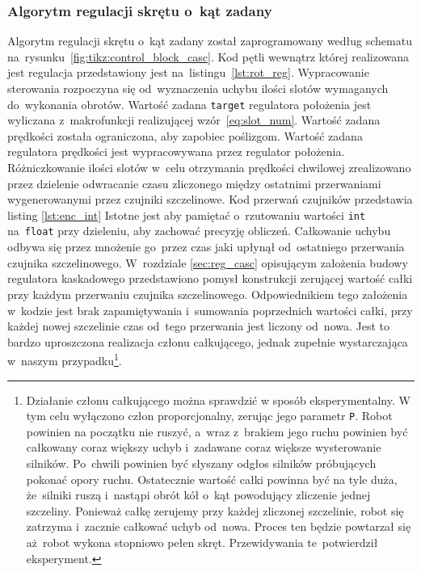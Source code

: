\documentclass[11pt]{article}
\begin{document}
\subsubsection{Algorytm regulacji skrętu o~kąt zadany}
Algorytm regulacji skrętu o~kąt zadany został zaprogramowany według schematu na~rysunku~\ref{fig:tikz:control_block_casc}.
Kod pętli wewnątrz której realizowana jest regulacja przedstawiony jest na~listingu~\ref{lst:rot_reg}.
Wypracowanie sterowania rozpoczyna się od~wyznaczenia uchybu ilości slotów wymaganych do~wykonania obrotów.
Wartość zadana \texttt{target} regulatora położenia jest wyliczana z~makrofunkcji realizującej wzór~\ref{eq:slot_num}.
Wartość zadana prędkości została ograniczona, aby zapobiec poślizgom.
Wartość zadana regulatora prędkości jest wypracowywana przez regulator położenia.
Różniczkowanie ilości slotów w~celu otrzymania prędkości chwilowej zrealizowano przez dzielenie odwracanie czasu zliczonego między ostatnimi przerwaniami wygenerowanymi przez czujniki szczelinowe.
Kod przerwań czujników przedstawia listing \ref{lst:enc_int}
Istotne jest aby pamiętać o~rzutowaniu wartości \texttt{int} na~\texttt{float} przy dzieleniu, aby zachować precyzję obliczeń.
Całkowanie uchybu odbywa się przez mnożenie go~przez czas jaki upłynął od~ostatniego przerwania czujnika szczelinowego.
W~rozdziale \ref{sec:reg_casc} opisującym założenia budowy regulatora kaskadowego przedstawiono pomysł konstrukcji zerującej wartość całki przy każdym przerwaniu czujnika szczelinowego.
Odpowiednikiem tego założenia w~kodzie jest brak zapamiętywania i~sumowania poprzednich wartości całki, przy każdej nowej szczelinie czas od~tego przerwania jest liczony od~nowa.
Jest to bardzo uproszczona realizacja członu całkującego, jednak zupełnie wystarczająca w~naszym przypadku\footnote{
	Działanie członu całkującego można sprawdzić w sposób eksperymentalny.
	W tym celu wyłączono człon proporcjonalny, zerując jego parametr \texttt{P}.
	Robot powinien na początku nie ruszyć, a~wraz z~brakiem jego ruchu powinien być całkowany coraz większy uchyb i~zadawane coraz większe wysterowanie silników.
	Po~chwili powinien być słyszany odgłos silników próbujących pokonać opory ruchu.
	Ostatecznie wartość całki powinna być na tyle duża, że~silniki ruszą i~nastąpi obrót kół o~kąt powodujący zliczenie jednej szczeliny.
	Ponieważ całkę zerujemy przy każdej zliczonej szczelinie, robot się zatrzyma i~zacznie całkować uchyb od~nowa.
	Proces ten będzie powtarzał się aż~robot wykona stopniowo pełen skręt.
	Przewidywania te~potwierdził eksperyment.
}.
\end{document}
